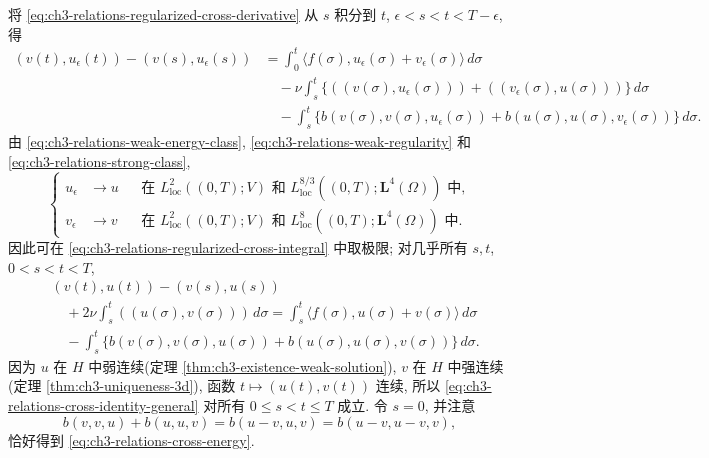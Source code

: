 \begin{Proof}
将 \eqref{eq:ch3-relations-regularized-cross-derivative} 从 $s$ 积分到 $t$, $\epsilon<s<t<T-\epsilon$, 得
\begin{equation}
\begin{aligned}
(v(t),u_\epsilon(t))-(v(s),u_\epsilon(s))
&=\int_0^t\langle f(\sigma),u_\epsilon(\sigma)+v_\epsilon(\sigma)\rangle\,d\sigma\\
&\quad-\nu\int_s^t\{((v(\sigma),u_\epsilon(\sigma)))
+((v_\epsilon(\sigma),u(\sigma)))\}\,d\sigma\\
&\quad-\int_s^t\{b(v(\sigma),v(\sigma),u_\epsilon(\sigma))
+b(u(\sigma),u(\sigma),v_\epsilon(\sigma))\}\,d\sigma.
\end{aligned}
\label{eq:ch3-relations-regularized-cross-integral}
\end{equation}
由 \eqref{eq:ch3-relations-weak-energy-class}, \eqref{eq:ch3-relations-weak-regularity} 和 \eqref{eq:ch3-relations-strong-class},
\begin{equation}
\left\{
\begin{aligned}
u_\epsilon&\longrightarrow u&&\text{在 }L_{\mathrm{loc}}^2((0,T);V)
\text{ 和 }L_{\mathrm{loc}}^{8/3}((0,T);\mathbf L^4(\Omega))\text{ 中},\\
v_\epsilon&\longrightarrow v&&\text{在 }L_{\mathrm{loc}}^2((0,T);V)
\text{ 和 }L_{\mathrm{loc}}^8((0,T);\mathbf L^4(\Omega))\text{ 中}.
\end{aligned}
\right.
\label{eq:ch3-relations-regularized-convergence}
\end{equation}
因此可在 \eqref{eq:ch3-relations-regularized-cross-integral} 中取极限; 对几乎所有 $s,t$, $0<s<t<T$,
\begin{equation}
\begin{aligned}
&(v(t),u(t))-(v(s),u(s))\\
&\quad+2\nu\int_s^t((u(\sigma),v(\sigma)))\,d\sigma
=\int_s^t\langle f(\sigma),u(\sigma)+v(\sigma)\rangle\,d\sigma\\
&\quad-\int_s^t\{b(v(\sigma),v(\sigma),u(\sigma))
+b(u(\sigma),u(\sigma),v(\sigma))\}\,d\sigma.
\end{aligned}
\label{eq:ch3-relations-cross-identity-general}
\end{equation}
因为 $u$ 在 $H$ 中弱连续(定理 \ref{thm:ch3-existence-weak-solution}), $v$ 在 $H$ 中强连续(定理 \ref{thm:ch3-uniqueness-3d}), 函数 $t\mapsto(u(t),v(t))$ 连续, 所以 \eqref{eq:ch3-relations-cross-identity-general} 对所有 $0\leq s<t\leq T$ 成立. 令 $s=0$, 并注意
\[
b(v,v,u)+b(u,u,v)=b(u-v,u,v)=b(u-v,u-v,v),
\]
恰好得到 \eqref{eq:ch3-relations-cross-energy}.
\end{Proof}

